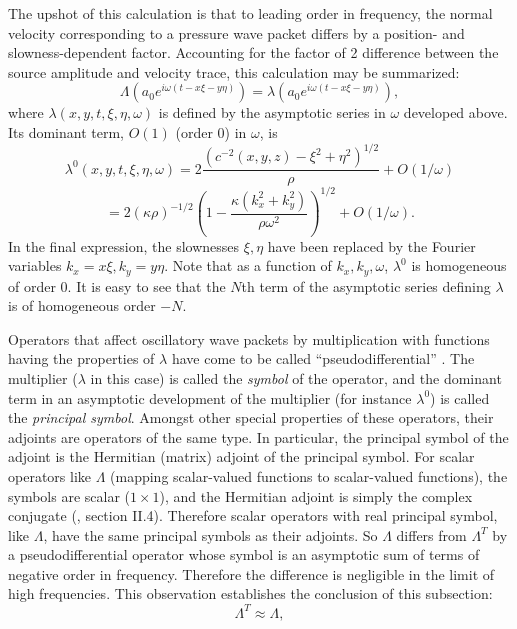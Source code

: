 \documentclass[12pt]{geophysics}
\begin{document}
The upshot of this calculation is that to leading order in frequency,
the normal velocity corresponding to a pressure wave packet differs by a position- and slowness-dependent
factor. Accounting for the factor of 2 difference between the source
amplitude and velocity trace, this calculation may be summarized:
\begin{equation}
  \label{eqn:lamwp}
  \Lambda (a_0e^{i\omega(t-x\xi-y\eta)}) = \lambda
  (a_0e^{i\omega(t-x\xi-y\eta)}),
\end{equation}
where $\lambda(x,y,t,\xi,\eta,\omega)$ is
defined by the asymptotic series in $\omega$ developed above. Its dominant term,
$O(1)$ (order 0) in $\omega$, is
\[
  \lambda^0(x,y,t,\xi,\eta,\omega) = 2\frac{( c^{-2}(x,y,z)-
    \xi^2+\eta^2)^{1/2}}{\rho} + O(1/\omega)
\]
\begin{equation}
  \label{eqn:lamsymb}
= 2(\kappa
\rho)^{-1/2}\left(1-\frac{\kappa(k_x^2+k_y^2)}{\rho \omega^2}\right)^{1/2} + O(1/\omega).
\end{equation}
In the final expression, the slownesses $\xi,\eta$ have been replaced
by the Fourier variables $k_x=x\xi, k_y=y\eta$. Note that as a
function of $k_x,k_y,\omega$, $\lambda^0$ is homogeneous of order
0. It is easy to see that the $N$th term of the asymptotic series
defining $\lambda$ is of homogeneous order $-N$.

%
Operators that affect oscillatory wave packets by multiplication with
functions having the properties of $\lambda$ have come to
be called ``pseudodifferential'' \cite[]{Nir:72,Tay:81,SaiR:91}. The multiplier ($\lambda$ in this
case) is called the {\em symbol} of the operator, and the dominant
term in an asymptotic development of the multiplier
(for instance $\lambda^0$) is called the {\em principal symbol}.
Amongst other special properties of these operators, their adjoints
are operators of the same type. In particular, the principal symbol of the adjoint is
the Hermitian (matrix) adjoint of the principal symbol. For scalar
operators like $\Lambda$ (mapping scalar-valued functions to
scalar-valued functions), the symbols are scalar ($1 \times 1$), and
the Hermitian adjoint is simply the complex conjugate (\cite{Tay:81},
section II.4). Therefore scalar operators with real principal symbol,
like $\Lambda$, have the same principal symbols as their adjoints. So
$\Lambda$ differs from $\Lambda^T$ by a pseudodifferential operator
whose symbol is an asymptotic sum of terms of negative order in
frequency. Therefore the difference is negligible in the limit of high
frequencies. This observation establishes the conclusion of this subsection: 
\begin{equation}
  \label{eqn:lamappsim}
  \Lambda^T \approx \Lambda,
\end{equation}
\end{document}
